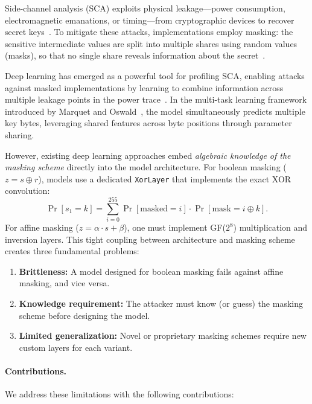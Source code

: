 \documentclass[submission]{iacrtrans}
\begin{document}
Side-channel analysis (SCA) exploits physical leakage---power consumption, electromagnetic emanations, or timing---from cryptographic devices to recover secret keys~\cite{kocher1999differential, brier2004correlation}. To mitigate these attacks, implementations employ masking: the sensitive intermediate values are split into multiple shares using random values (masks), so that no single share reveals information about the secret~\cite{chari1999towards, rivain2010provably}.

Deep learning has emerged as a powerful tool for profiling SCA, enabling attacks against masked implementations by learning to combine information across multiple leakage points in the power trace~\cite{maghrebi2016breaking, benadjila2020deep, kim2019make}. In the multi-task learning framework introduced by Marquet and Oswald~\cite{marquet2024exploring}, the model simultaneously predicts multiple key bytes, leveraging shared features across byte positions through parameter sharing.

However, existing deep learning approaches embed \emph{algebraic knowledge of the masking scheme} directly into the model architecture. For boolean masking ($z = s \oplus r$), models use a dedicated \texttt{XorLayer} that implements the exact XOR convolution:
\begin{equation}\label{eq:xor_conv}
  \Pr[s_1 = k] = \sum_{i=0}^{255} \Pr[\text{masked} = i] \cdot \Pr[\text{mask} = i \oplus k].
\end{equation}
For affine masking ($z = \alpha \cdot s + \beta$), one must implement GF($2^8$) multiplication and inversion layers. This tight coupling between architecture and masking scheme creates three fundamental problems:
\begin{enumerate}[leftmargin=*]
  \item \textbf{Brittleness:} A model designed for boolean masking fails against affine masking, and vice versa.
  \item \textbf{Knowledge requirement:} The attacker must know (or guess) the masking scheme before designing the model.
  \item \textbf{Limited generalization:} Novel or proprietary masking schemes require new custom layers for each variant.
\end{enumerate}

\paragraph{Contributions.} We address these limitations with the following contributions:
\end{document}
